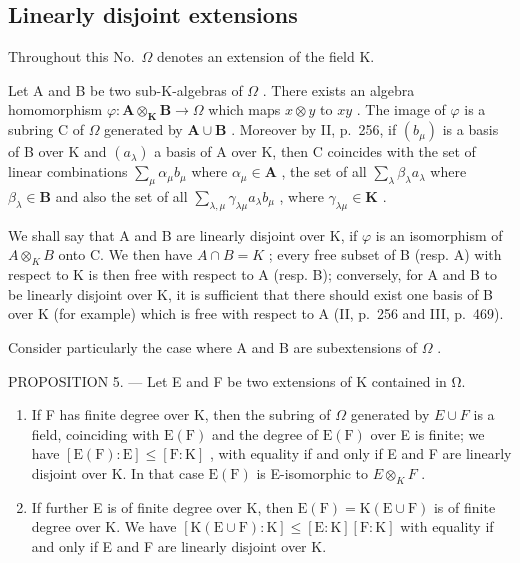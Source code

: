 \subsection{Linearly disjoint extensions}

Throughout this No.~\(\Omega\) denotes an extension of the field K.

Let A and B be two sub-K-algebras of \(\Omega\) . There exists an algebra homomorphism \(\varphi: \mathbf{A} \otimes_{\mathbf{K}} \mathbf{B} \to \Omega\) which maps \(x \otimes y\) to \(xy\) . The image of \(\varphi\) is a subring C of \(\Omega\) generated by \(\mathbf{A} \cup \mathbf{B}\) . Moreover by II, p.~256, if \((b_{\mu})\) is a basis of B over K and \((a_{\lambda})\) a basis of A over K, then C coincides with the set of linear combinations \(\sum_{\mu} \alpha_{\mu} b_{\mu}\) where \(\alpha_{\mu} \in \mathbf{A}\) , the set of all \(\sum_{\lambda} \beta_{\lambda} a_{\lambda}\) where \(\beta_{\lambda} \in \mathbf{B}\) and also the set of all \(\sum_{\lambda, \mu} \gamma_{\lambda \mu} a_{\lambda} b_{\mu}\) , where \(\gamma_{\lambda \mu} \in \mathbf{K}\) .

We shall say that A and B are linearly disjoint over K, if \(\varphi\) is an isomorphism of \(A \otimes_{K} B\) onto C. We then have \(A \cap B = K\) ; every free subset of B (resp. A) with respect to K is then free with respect to A (resp. B); conversely, for A and B to be linearly disjoint over K, it is sufficient that there should exist one basis of B over K (for example) which is free with respect to A (II, p.~256 and III, p.~469).

Consider particularly the case where A and B are subextensions of \(\Omega\) .

PROPOSITION 5. --- Let E and F be two extensions of K contained in Ω.

\begin{enumerate}
\def\labelenumi{\alph{enumi})}
\item
  If F has finite degree over K, then the subring of \(\Omega\) generated by \(E \cup F\) is a field, coinciding with \(\mathrm{E}(\mathrm{F})\) and the degree of \(\mathrm{E}(\mathrm{F})\) over E is finite; we have \([\mathrm{E}(\mathrm{F}):\mathrm{E}] \leqslant [\mathrm{F}:\mathrm{K}]\) , with equality if and only if E and F are linearly disjoint over K. In that case \(\mathrm{E}(\mathrm{F})\) is E-isomorphic to \(E \otimes_{K} F\) .
\item
  If further E is of finite degree over K, then \(\mathrm{E}(\mathrm{F})=\mathrm{K}(\mathrm{E}\cup\mathrm{F})\) is of finite degree over K. We have \([\mathrm{K}(\mathrm{E}\cup\mathrm{F}):\mathrm{K}]\leqslant[\mathrm{E}:\mathrm{K}][\mathrm{F}:\mathrm{K}]\) with equality if and only if E and F are linearly disjoint over K.
\end{enumerate}

